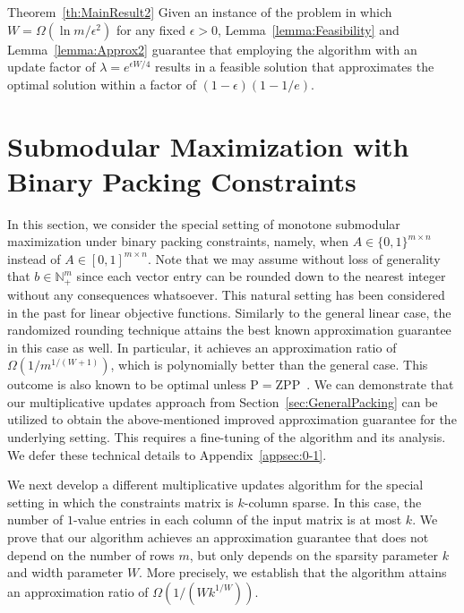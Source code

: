 \documentclass[11pt]{article}
\theoremstyle{plain}
\theoremstyle{definition}
\newcommand{\bbN}{\mathbb{N}}
\begin{document}
\begin{proofof}{Theorem~\ref{th:MainResult2}}
Given an instance of the problem in which $W = \Omega(\ln m /
\epsilon^2)$ for any fixed $\epsilon > 0$,
Lemma~\ref{lemma:Feasibility} and Lemma~\ref{lemma:Approx2}
guarantee that employing the algorithm with an update factor of
$\lambda = e^{\epsilon W/4}$ results in a feasible solution that
approximates the optimal solution within a factor of $(1 -
\epsilon)(1 - 1/e)$.~
\end{proofof}


\section{Submodular Maximization with Binary Packing Constraints} \label{subsec:0-1Packing}
In this section, we consider the special setting of monotone
submodular maximization under binary packing constraints, namely,
when $A \in \{0,1\}^{m \times n}$ instead of $A \in [0,1]^{m
\times n}$. Note that we may assume without loss of generality
that $b \in \bbN_+^m$ since each vector entry can be rounded down
to the nearest integer without any consequences whatsoever. This
natural setting has been considered in the past for linear
objective functions. Similarly to the general linear case, the
randomized rounding technique attains the best known approximation
guarantee in this case as well. In particular, it achieves an
approximation ratio of $\Omega(1 / m^{1/(W+1)})$, which is
polynomially better than the general case. This outcome is also
known to be optimal unless $\mathrm{P} =
\mathrm{ZPP}$~\cite{ChekuriK04}. We can demonstrate that our
multiplicative updates approach from
Section~\ref{sec:GeneralPacking} can be utilized to obtain the
above-mentioned improved approximation guarantee for the
underlying setting. This requires a fine-tuning of the algorithm
and its analysis. We defer these technical details to
Appendix~\ref{appsec:0-1}.

We next develop a different multiplicative updates algorithm for
the special setting in which the constraints matrix is $k$-column
sparse. In this case, the number of $1$-value entries in each
column of the input matrix is at most $k$. We prove that our
algorithm achieves an approximation guarantee that does not depend
on the number of rows $m$, but only depends on the sparsity
parameter $k$ and width parameter $W$. More precisely, we
establish that the algorithm attains an approximation ratio of
$\Omega(1 / (Wk^{1/W}))$.
\end{document}
